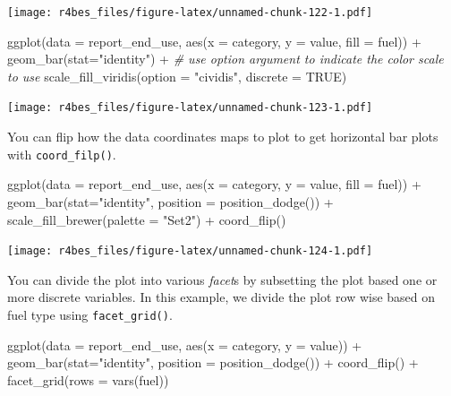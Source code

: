 \documentclass[
]{book}
\newenvironment{Shaded}{\begin{snugshade}}{\end{snugshade}}
\newcommand{\AttributeTok}[1]{\textcolor[rgb]{0.77,0.63,0.00}{#1}}
\newcommand{\CommentTok}[1]{\textcolor[rgb]{0.56,0.35,0.01}{\textit{#1}}}
\newcommand{\ConstantTok}[1]{\textcolor[rgb]{0.00,0.00,0.00}{#1}}
\newcommand{\FunctionTok}[1]{\textcolor[rgb]{0.00,0.00,0.00}{#1}}
\newcommand{\NormalTok}[1]{#1}
\newcommand{\SpecialCharTok}[1]{\textcolor[rgb]{0.00,0.00,0.00}{#1}}
\newcommand{\StringTok}[1]{\textcolor[rgb]{0.31,0.60,0.02}{#1}}
\begin{document}
\texttt{[image: r4bes\_files/figure-latex/unnamed-chunk-122-1.pdf]}

\begin{Shaded}
\begin{Highlighting}[]
\FunctionTok{ggplot}\NormalTok{(}\AttributeTok{data =}\NormalTok{ report\_end\_use, }\FunctionTok{aes}\NormalTok{(}\AttributeTok{x =}\NormalTok{ category, }\AttributeTok{y =}\NormalTok{ value, }\AttributeTok{fill =}\NormalTok{ fuel)) }\SpecialCharTok{+}
    \FunctionTok{geom\_bar}\NormalTok{(}\AttributeTok{stat=}\StringTok{"identity"}\NormalTok{) }\SpecialCharTok{+} 
    \CommentTok{\# use option argument to indicate the color scale to use}
    \FunctionTok{scale\_fill\_viridis}\NormalTok{(}\AttributeTok{option =} \StringTok{"cividis"}\NormalTok{,}
                       \AttributeTok{discrete =} \ConstantTok{TRUE}\NormalTok{) }
\end{Highlighting}
\end{Shaded}

\texttt{[image: r4bes\_files/figure-latex/unnamed-chunk-123-1.pdf]}

You can flip how the data coordinates maps to plot to get horizontal bar plots with \texttt{coord\_filp()}.

\begin{Shaded}
\begin{Highlighting}[]
\FunctionTok{ggplot}\NormalTok{(}\AttributeTok{data =}\NormalTok{ report\_end\_use, }\FunctionTok{aes}\NormalTok{(}\AttributeTok{x =}\NormalTok{ category, }\AttributeTok{y =}\NormalTok{ value, }\AttributeTok{fill =}\NormalTok{ fuel)) }\SpecialCharTok{+}
    \FunctionTok{geom\_bar}\NormalTok{(}\AttributeTok{stat=}\StringTok{"identity"}\NormalTok{, }\AttributeTok{position =} \FunctionTok{position\_dodge}\NormalTok{()) }\SpecialCharTok{+} 
    \FunctionTok{scale\_fill\_brewer}\NormalTok{(}\AttributeTok{palette =} \StringTok{"Set2"}\NormalTok{) }\SpecialCharTok{+}
    \FunctionTok{coord\_flip}\NormalTok{()}
\end{Highlighting}
\end{Shaded}

\texttt{[image: r4bes\_files/figure-latex/unnamed-chunk-124-1.pdf]}

You can divide the plot into various \emph{facet}s by subsetting the plot based one or more discrete variables. In this example, we divide the plot row wise based on fuel type using \texttt{facet\_grid()}.

\begin{Shaded}
\begin{Highlighting}[]
\FunctionTok{ggplot}\NormalTok{(}\AttributeTok{data =}\NormalTok{ report\_end\_use, }\FunctionTok{aes}\NormalTok{(}\AttributeTok{x =}\NormalTok{ category, }\AttributeTok{y =}\NormalTok{ value)) }\SpecialCharTok{+}
    \FunctionTok{geom\_bar}\NormalTok{(}\AttributeTok{stat=}\StringTok{"identity"}\NormalTok{, }\AttributeTok{position =} \FunctionTok{position\_dodge}\NormalTok{()) }\SpecialCharTok{+} 
    \FunctionTok{coord\_flip}\NormalTok{() }\SpecialCharTok{+}
    \FunctionTok{facet\_grid}\NormalTok{(}\AttributeTok{rows =} \FunctionTok{vars}\NormalTok{(fuel))}
\end{Highlighting}
\end{Shaded}
\end{document}

